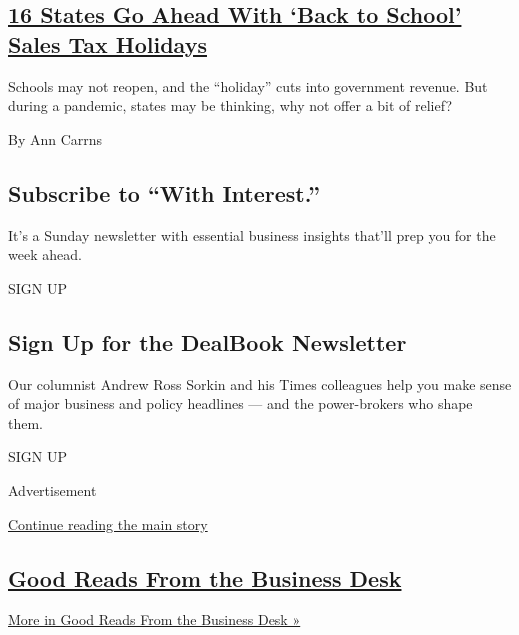 \begin{enumerate}
{  \subsection{\texorpdfstring{\href{/2020/07/24/your-money/back-to-school-tax-holiday-coronavirus.html}{16
  States Go Ahead With `Back to School' Sales Tax
  Holidays}}{16 States Go Ahead With `Back to School' Sales Tax Holidays}}\label{16-states-go-ahead-with-back-to-school-sales-tax-holidays}}

  Schools may not reopen, and the ``holiday'' cuts into government
  revenue. But during a pandemic, states may be thinking, why not offer
  a bit of relief?

  By Ann Carrns
\end{enumerate}

\hypertarget{subscribe-to-with-interest}{%
\subsection{Subscribe to ``With
Interest.''}\label{subscribe-to-with-interest}}

It's a Sunday newsletter with essential business insights that'll prep
you for the week ahead.

SIGN UP

\hypertarget{sign-up-for-the-dealbook-newsletter}{%
\subsection{Sign Up for the DealBook
Newsletter}\label{sign-up-for-the-dealbook-newsletter}}

Our columnist Andrew Ross Sorkin and his Times colleagues help you make
sense of major business and policy headlines --- and the power-brokers
who shape them.

SIGN UP

Advertisement

\protect\hyperlink{after-mid1}{Continue reading the main story}

\hypertarget{good-reads-from-the-business-desk}{%
\subsection{\texorpdfstring{\href{/spotlight/editors-picks-business}{Good
Reads From the Business
Desk}}{Good Reads From the Business Desk}}\label{good-reads-from-the-business-desk}}

\href{/spotlight/editors-picks-business}{More in Good Reads From the
Business Desk »}

